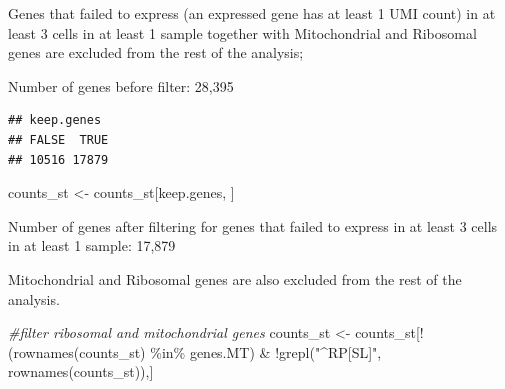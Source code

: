 \documentclass[
  openany]{book}
\newenvironment{Shaded}{\begin{snugshade}}{\end{snugshade}}
\newcommand{\CommentTok}[1]{\textcolor[rgb]{0.56,0.35,0.01}{\textit{#1}}}
\newcommand{\ControlFlowTok}[1]{\textcolor[rgb]{0.13,0.29,0.53}{\textbf{#1}}}
\newcommand{\DecValTok}[1]{\textcolor[rgb]{0.00,0.00,0.81}{#1}}
\newcommand{\FunctionTok}[1]{\textcolor[rgb]{0.00,0.00,0.00}{#1}}
\newcommand{\NormalTok}[1]{#1}
\newcommand{\OtherTok}[1]{\textcolor[rgb]{0.56,0.35,0.01}{#1}}
\newcommand{\SpecialCharTok}[1]{\textcolor[rgb]{0.00,0.00,0.00}{#1}}
\newcommand{\StringTok}[1]{\textcolor[rgb]{0.31,0.60,0.02}{#1}}
\begin{document}
Genes that failed to express (an expressed gene has at least 1 UMI count) in at least 3 cells in at least 1 sample together with Mitochondrial and Ribosomal genes are excluded from the rest of the analysis;

Number of genes before filter: 28,395

\begin{Shaded}
\end{Shaded}

\begin{verbatim}
## keep.genes
## FALSE  TRUE 
## 10516 17879
\end{verbatim}

\begin{Shaded}
\begin{Highlighting}[]
\NormalTok{counts\_st }\OtherTok{\textless{}{-}}\NormalTok{ counts\_st[keep.genes, ]}
\end{Highlighting}
\end{Shaded}

Number of genes after filtering for genes that failed to express in at least 3 cells in at least 1 sample: 17,879

Mitochondrial and Ribosomal genes are also excluded from the rest of the analysis.

\begin{Shaded}
\begin{Highlighting}[]
\CommentTok{\#filter ribosomal and mitochondrial genes}
\NormalTok{counts\_st }\OtherTok{\textless{}{-}}
\NormalTok{  counts\_st[}\SpecialCharTok{!}\NormalTok{(}\FunctionTok{rownames}\NormalTok{(counts\_st) }\SpecialCharTok{\%in\%}\NormalTok{ genes.MT) }\SpecialCharTok{\&}
       \SpecialCharTok{!}\FunctionTok{grepl}\NormalTok{(}\StringTok{"\^{}RP[SL]"}\NormalTok{, }\FunctionTok{rownames}\NormalTok{(counts\_st)),]}
\end{Highlighting}
\end{Shaded}
\end{document}
